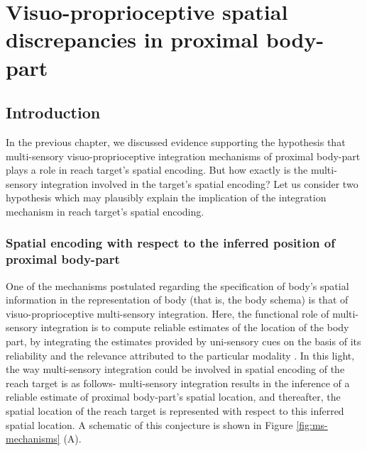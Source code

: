 \chapter{Visuo-proprioceptive spatial discrepancies in proximal body-part}
\label{exp2}

\section{Introduction}

In the previous chapter, we discussed evidence supporting the hypothesis that multi-sensory visuo-proprioceptive integration mechanisms of proximal body-part plays a role in reach target's spatial encoding. But how exactly is the multi-sensory integration involved in the target's spatial encoding? Let us consider two hypothesis which may plausibly explain the implication of the integration mechanism in reach target's spatial encoding.




\subsection{Spatial encoding with respect to the inferred position of proximal body-part}

One of the mechanisms postulated regarding the specification of body's spatial information in the representation of body (that is, the body schema) is that of visuo-proprioceptive multi-sensory integration. Here, the functional role of multi-sensory integration is to compute reliable estimates of the location of the body part, by integrating the estimates provided by uni-sensory cues on the basis of its reliability and the relevance attributed to the particular modality \cite{limanowski2016integration, noel2018peri, kording2007causal, van1999integration}. In this light, the way multi-sensory integration could be involved in spatial encoding of the reach target is as follows- multi-sensory integration results in the inference of a reliable estimate of proximal body-part's spatial location, and thereafter, the spatial location of the reach target is represented with respect to this inferred spatial location. A schematic of this conjecture is shown in Figure \ref{fig:ms-mechanisms} (A).


